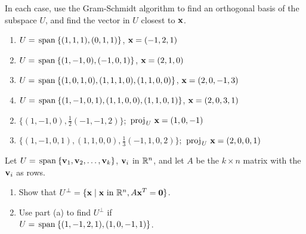 \begin{multicols}{2}
\begin{ex}
\begin{sol}
\begin{enumerate}[label={\alph*.}]
\end{enumerate}
\end{sol}
\end{ex}

\begin{ex}
In each case, use the Gram-Schmidt algorithm to find an orthogonal basis of the subspace $U$, and find the vector in $U$ closest to $\textbf{x}$.

\begin{enumerate}[label={\alph*.}]
\item $U = \thinspace\operatorname{span\medspace}\{(1, 1, 1), (0, 1, 1)\}$, $\textbf{x} = (-1, 2, 1)$

\item $U = \thinspace\operatorname{span\medspace}\{(1, -1, 0), (-1, 0, 1)\}$, $\textbf{x} = (2, 1, 0)$

\item $U = \thinspace\operatorname{span\medspace}\{(1, 0, 1, 0), (1, 1, 1, 0), (1, 1, 0, 0)\}$, $\textbf{x} = (2, 0, -1, 3)$

\item $U = \thinspace\operatorname{span\medspace}\{(1, -1, 0, 1), (1, 1, 0, 0), (1, 1, 0, 1)\}$, $\textbf{x} = (2, 0, 3, 1)$

\end{enumerate}
\begin{sol}
\begin{enumerate}[label={\alph*.}]
\setcounter{enumi}{1}
\item  $\{(1, -1, 0), \frac{1}{2}(-1, -1, 2)\}$; $\thinspace\operatorname{proj\medspace}_{\!U}\,{\textbf{x}} = (1, 0, -1)$

\setcounter{enumi}{3}
\item $\{(1, -1, 0, 1), (1, 1, 0, 0), \frac{1}{3}(-1, 1, 0, 2)\}$; $\thinspace\operatorname{proj\medspace}_{\!U}\,{\textbf{x}} = (2, 0, 0, 1)$

\end{enumerate}
\end{sol}
\end{ex}

\begin{ex}
Let $U = \thinspace\operatorname{span\medspace}\{\textbf{v}_{1}, \textbf{v}_{2}, \dots, \textbf{v}_{k}\}$, $\textbf{v}_{i}$ in $\mathbb{R}^n$, and let $A$ be the $k \times n$ matrix with the $\textbf{v}_{i}$ as rows.


\begin{enumerate}[label={\alph*.}]
\item Show that $U^\perp = \{\textbf{x} \mid  \textbf{x} \mbox{ in } \mathbb{R}^n, A\textbf{x}^{T} = \textbf{0}\}$.

\item Use part (a) to find $U^\perp$ if \\ $U = \thinspace\operatorname{span\medspace}\{(1, -1, 2, 1), (1, 0, -1, 1)\}$.


\end{enumerate}
\end{ex}
\end{multicols}
